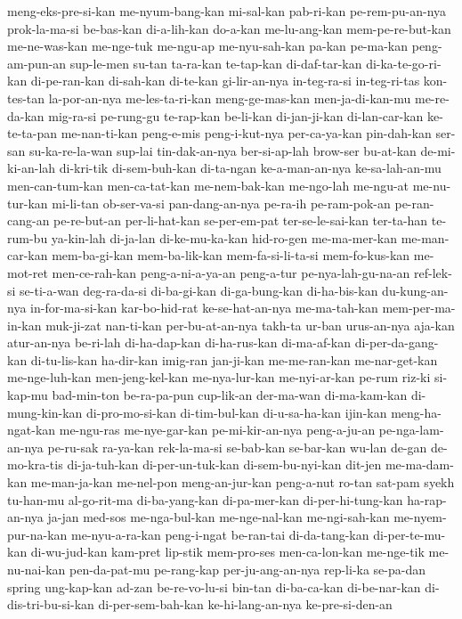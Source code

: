 {meng-eks-pre-si-kan me-nyum-bang-kan mi-sal-kan pab-ri-kan pe-rem-pu-an-nya prok-la-ma-si be-bas-kan di-a-lih-kan
do-a-kan me-lu-ang-kan mem-pe-re-but-kan me-ne-was-kan me-nge-tuk me-ngu-ap me-nyu-sah-kan pa-kan
pe-ma-kan peng-am-pun-an sup-le-men su-tan ta-ra-kan te-tap-kan di-daf-tar-kan di-ka-te-go-ri-kan
di-pe-ran-kan di-sah-kan di-te-kan gi-lir-an-nya in-teg-ra-si in-teg-ri-tas kon-tes-tan la-por-an-nya
me-les-ta-ri-kan meng-ge-mas-kan men-ja-di-kan-mu me-re-da-kan mig-ra-si pe-rung-gu te-rap-kan be-li-kan
di-jan-ji-kan di-lan-car-kan ke-te-ta-pan me-nan-ti-kan peng-e-mis peng-i-kut-nya per-ca-ya-kan pin-dah-kan
ser-san su-ka-re-la-wan sup-lai tin-dak-an-nya ber-si-ap-lah brow-ser bu-at-kan de-mi-ki-an-lah
di-kri-tik di-sem-buh-kan di-ta-ngan ke-a-man-an-nya ke-sa-lah-an-mu men-can-tum-kan men-ca-tat-kan me-nem-bak-kan
me-ngo-lah me-ngu-at me-nu-tur-kan mi-li-tan ob-ser-va-si pan-dang-an-nya pe-ra-ih pe-ram-pok-an
pe-ran-cang-an pe-re-but-an per-li-hat-kan se-per-em-pat ter-se-le-sai-kan ter-ta-han te-rum-bu ya-kin-lah
di-ja-lan di-ke-mu-ka-kan hid-ro-gen me-ma-mer-kan me-man-car-kan mem-ba-gi-kan mem-ba-lik-kan mem-fa-si-li-ta-si
mem-fo-kus-kan me-mot-ret men-ce-rah-kan peng-a-ni-a-ya-an peng-a-tur pe-nya-lah-gu-na-an ref-lek-si se-ti-a-wan
deg-ra-da-si di-ba-gi-kan di-ga-bung-kan di-ha-bis-kan du-kung-an-nya in-for-ma-si-kan kar-bo-hid-rat ke-se-hat-an-nya
me-ma-tah-kan mem-per-ma-in-kan muk-ji-zat nan-ti-kan per-bu-at-an-nya takh-ta ur-ban urus-an-nya
aja-kan atur-an-nya be-ri-lah di-ha-dap-kan di-ha-rus-kan di-ma-af-kan di-per-da-gang-kan di-tu-lis-kan
ha-dir-kan imig-ran jan-ji-kan me-me-ran-kan me-nar-get-kan me-nge-luh-kan men-jeng-kel-kan me-nya-lur-kan
me-nyi-ar-kan pe-rum riz-ki si-kap-mu bad-min-ton be-ra-pa-pun cup-lik-an der-ma-wan
di-ma-kam-kan di-mung-kin-kan di-pro-mo-si-kan di-tim-bul-kan di-u-sa-ha-kan ijin-kan meng-ha-ngat-kan me-ngu-ras
me-nye-gar-kan pe-mi-kir-an-nya peng-a-ju-an pe-nga-lam-an-nya pe-ru-sak ra-ya-kan rek-la-ma-si se-bab-kan
se-bar-kan wu-lan de-gan de-mo-kra-tis di-ja-tuh-kan di-per-un-tuk-kan di-sem-bu-nyi-kan dit-jen
me-ma-dam-kan me-man-ja-kan me-nel-pon meng-an-jur-kan peng-a-nut ro-tan sat-pam syekh
tu-han-mu al-go-rit-ma di-ba-yang-kan di-pa-mer-kan di-per-hi-tung-kan ha-rap-an-nya ja-jan med-sos
me-nga-bul-kan me-nge-nal-kan me-ngi-sah-kan me-nyem-pur-na-kan me-nyu-a-ra-kan peng-i-ngat be-ran-tai di-da-tang-kan
di-per-te-mu-kan di-wu-jud-kan kam-pret lip-stik mem-pro-ses men-ca-lon-kan me-nge-tik me-nu-nai-kan
pen-da-pat-mu pe-rang-kap per-ju-ang-an-nya rep-li-ka se-pa-dan spring ung-kap-kan ad-zan
be-re-vo-lu-si bin-tan di-ba-ca-kan di-be-nar-kan di-dis-tri-bu-si-kan di-per-sem-bah-kan ke-hi-lang-an-nya ke-pre-si-den-an
}
